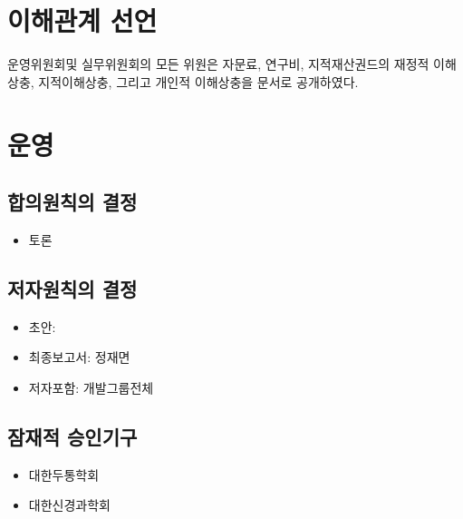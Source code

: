 \documentclass[]{book}
\providecommand{\tightlist}{%
  \setlength{\itemsep}{0pt}\setlength{\parskip}{0pt}}
\begin{document}
\hypertarget{section-33}{%
\section*{이해관계 선언}\label{section-33}}

운영위원회및 실무위원회의 모든 위원은 자문료, 연구비, 지적재산권드의 재정적 이해상충, 지적이해상충, 그리고 개인적 이해상충을 문서로 공개하였다.

\hypertarget{section-34}{%
\section*{운영}\label{section-34}}

\hypertarget{section-35}{%
\subsection*{합의원칙의 결정}\label{section-35}}

\begin{itemize}
\tightlist
\item
  토론
\end{itemize}

\hypertarget{section-36}{%
\subsection*{저자원칙의 결정}\label{section-36}}

\begin{itemize}
\tightlist
\item
  초안:
\item
  최종보고서: 정재면
\item
  저자포함: 개발그룹전체
\end{itemize}

\hypertarget{section-37}{%
\subsection*{잠재적 승인기구}\label{section-37}}

\begin{itemize}
\tightlist
\item
  대한두통학회
\item
  대한신경과학회
\end{itemize}
\end{document}
